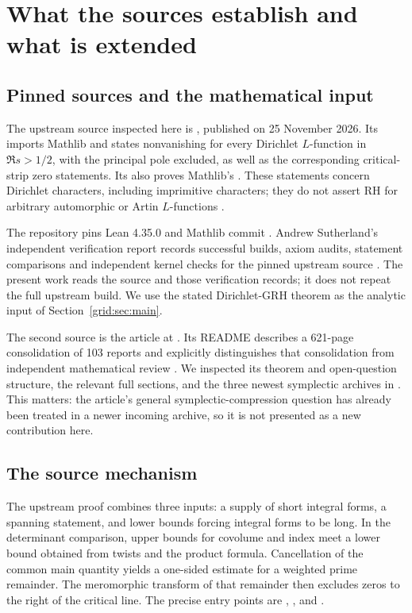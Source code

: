 \section{What the sources establish and what is extended}
\label{sec:context}

\subsection{Pinned sources and the mathematical input}

The upstream source inspected here is \srcgrh, published on 25 November
2026. Its  imports Mathlib and states
nonvanishing for every Dirichlet $L$-function in $\Re s>1/2$, with the
principal pole excluded, as well as the corresponding critical-strip
zero statements. Its  also proves Mathlib's
. These statements concern Dirichlet characters,
including imprimitive characters; they do not assert RH for arbitrary
automorphic or Artin $L$-functions \cite{Sernau2026}.

The repository pins Lean 4.35.0 and Mathlib commit
.
Andrew Sutherland's independent verification report records successful
builds, axiom audits, statement comparisons and independent kernel checks
for the pinned upstream source \cite{Sutherland2026}.
The present work reads the source and those verification records; it does
not repeat the full upstream build. We use the stated Dirichlet-GRH theorem
as the analytic input of Section~\ref{grid:sec:main}.

The second source is the article at \srcarticle. Its README describes a
621-page consolidation of 103 reports and explicitly distinguishes that
consolidation from independent mathematical review \cite{ProveIt2026}.
We inspected its theorem and open-question structure, the relevant full
sections, and the three newest symplectic archives in .
This matters: the article's general symplectic-compression question has
already been treated in a newer incoming archive, so it is not presented
as a new contribution here.

\subsection{The source mechanism}

The upstream proof combines three inputs: a supply of short integral
forms, a spanning statement, and lower bounds forcing integral forms to
be long. In the determinant comparison, upper bounds for covolume and
index meet a lower bound obtained from twists and the product formula.
Cancellation of the common main quantity yields a one-sided estimate for
a weighted prime remainder. The meromorphic transform of that remainder
then excludes zeros to the right of the critical line. The precise entry
points are
,
, and
 \cite{Sernau2026}.

